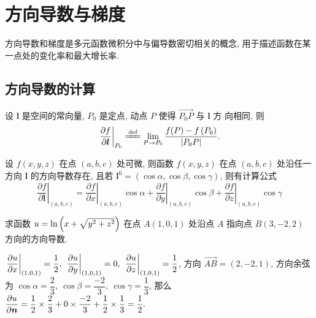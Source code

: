 \section{方向导数与梯度}

方向导数和梯度是多元函数微积分中与偏导数密切相关的概念, 用于描述函数在某一点处的变化率和最大增长率.

\subsection{方向导数的计算}

\begin{definition}[方向导数]
    设 $ \boldsymbol{l} $ 是空间的常向量, $P_{0} $ 是定点, 动点 $ P $ 使得 $ \overrightarrow{P_{0} P} $ 与 $ \boldsymbol{l} $ 方 向相同, 则
    $$\left.\frac{\partial f}{\partial \boldsymbol{\boldsymbol{l}}}\right|_{P_{0}} \xlongequal[]{\text{def}} \lim _{P \to P_{0}} \frac{f(P)-f\left(P_{0}\right)}{\left|P_{0} P\right|}.$$
\end{definition}

\begin{theorem}[方向导数的计算]
    设 $ f(x, y, z) $ 在点 $ (a, b, c) $ 处可微, 则函数 $ f(x, y, z) $ 在点 $ (a, b, c) $ 处沿任一方向 $ \boldsymbol{l} $ 的方向导数存在, 
    且若 $ \boldsymbol{l}^{0}=(\cos \alpha, \cos \beta, \cos \gamma) $, 则有计算公式
    $$\left.\frac{\partial f}{\partial\boldsymbol{l}}\right|_{(a, b, c)}=\left.\frac{\partial f}{\partial x}\right|_{(a, b, c)} \cos \alpha+\left.\frac{\partial f}{\partial y}\right|_{(a, b, c)} \cos \beta+\left.\frac{\partial f}{\partial z}\right|_{(a, b, c)} \cos \gamma$$
\end{theorem}

\begin{example}[1996 数一]
    求函数 $u=\ln\qty(x+\sqrt{y^2+z^2})$ 在点 $A(1,0,1)$ 处沿点 $A$ 指向点 $B(3,-2,2)$ 方向的方向导数.
\end{example}
\begin{solution}
    $\displaystyle \eval{\pdv{u}{x}}_{(1,0,1)}=\dfrac{1}{2},~\eval{\pdv{u}{y}}_{(1,0,1)}=0,~\eval{\pdv{u}{z}}_{(1,0,1)}=\dfrac{1}{2}$, 方向 $\overrightarrow{AB}=(2,-2,1)$, 
    方向余弦为 $\cos\alpha=\dfrac{2}{3},~\cos\beta=\dfrac{-2}{3},~\cos\gamma=\dfrac{1}{3}$, 那么 $\displaystyle\pdv{u}{\vb*{n}}=\dfrac{1}{2}\times\dfrac{2}{3}+0\times\dfrac{-2}{3}+\dfrac{1}{2}\times\dfrac{1}{3}=\dfrac{1}{2}.$
\end{solution}

